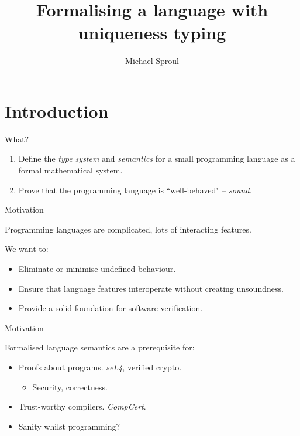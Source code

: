 \documentclass[10pt]{beamer}
\title{Formalising a language with uniqueness typing}
\author{Michael Sproul}
\date{}
\institute{
    Supervisor: Ben Lippmeier\\
    University of New South Wales
}
\begin{document}
\maketitle

\section{Introduction}

\begin{frame}{What?}

\begin{enumerate}
\item Define the \textit{type system} and \textit{semantics} for a small programming language as a formal mathematical system.
\item Prove that the programming language is ``well-behaved" -- \textit{sound}.
\end{enumerate}
\end{frame}

\begin{frame}
{Motivation}

Programming languages are complicated, lots of interacting features.

We want to:

\begin{itemize}
\item Eliminate or minimise undefined behaviour.

\item Ensure that language features interoperate without creating unsoundness.

\item Provide a solid foundation for software verification.

\end{itemize}
\end{frame}

\begin{frame}
{Motivation}

Formalised language semantics are a prerequisite for:

\begin{itemize}
\item Proofs about programs. \textit{seL4}, verified crypto.
    \begin{itemize}
    \item Security, correctness.
    \end{itemize}
\item Trust-worthy compilers. \textit{CompCert}.
\item Sanity whilst programming?
\end{itemize}
\end{frame}
\end{document}
